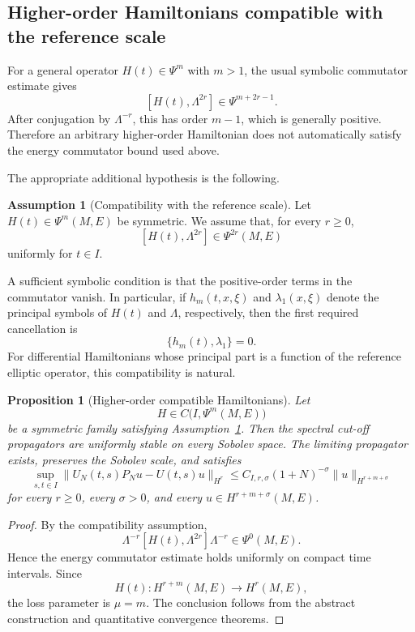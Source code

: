 \documentclass[11pt]{amsart}
\theoremstyle{plain}
\newtheorem{proposition}[theorem]{Proposition}
\theoremstyle{definition}
\newtheorem{assumption}[theorem]{Assumption}
\theoremstyle{remark}
\begin{document}
\subsection{Higher-order Hamiltonians compatible with the reference scale}
\label{subsec:higher-order-compatible-hamiltonians}

For a general operator \(H(t)\in\Psi^{m}\) with \(m>1\), the usual symbolic
commutator estimate gives
\[
[H(t),\Lambda^{2r}]
\in
\Psi^{m+2r-1}.
\]
After conjugation by \(\Lambda^{-r}\), this has order \(m-1\), which is
generally positive. Therefore an arbitrary higher-order Hamiltonian does not
automatically satisfy the energy commutator bound used above.

The appropriate additional hypothesis is the following.

\begin{assumption}[Compatibility with the reference scale]
\label{ass:principal-symbol-compatibility}
Let \(H(t)\in\Psi^{m}(M,E)\) be symmetric. We assume that, for every
\(r\geq 0\),
\[
[H(t),\Lambda^{2r}]
\in
\Psi^{2r}(M,E)
\]
uniformly for \(t\in I\).
\end{assumption}

A sufficient symbolic condition is that the positive-order terms in the
commutator vanish. In particular, if \(h_{m}(t,x,\xi)\) and
\(\lambda_{1}(x,\xi)\) denote the principal symbols of \(H(t)\) and
\(\Lambda\), respectively, then the first required cancellation is
\[
\{h_{m}(t),\lambda_{1}\}=0.
\]
For differential Hamiltonians whose principal part is a function of the
reference elliptic operator, this compatibility is natural.

\begin{proposition}[Higher-order compatible Hamiltonians]
\label{prop:higher-order-compatible-hamiltonians}
Let
\[
H\in C\bigl(I,\Psi^{m}(M,E)\bigr)
\]
be a symmetric family satisfying
Assumption~\ref{ass:principal-symbol-compatibility}. Then the spectral cut-off
propagators are uniformly stable on every Sobolev space. The limiting
propagator exists, preserves the Sobolev scale, and satisfies
\[
\sup_{s,t\in I}
\|U_{N}(t,s)P_{N}u-U(t,s)u\|_{H^{r}}
\leq
C_{I,r,\sigma}(1+N)^{-\sigma}
\|u\|_{H^{r+m+\sigma}}
\]
for every \(r\geq 0\), every \(\sigma>0\), and every
\(u\in H^{r+m+\sigma}(M,E)\).
\end{proposition}

\begin{proof}
By the compatibility assumption,
\[
\Lambda^{-r}[H(t),\Lambda^{2r}]\Lambda^{-r}
\in
\Psi^{0}(M,E).
\]
Hence the energy commutator estimate holds uniformly on compact time
intervals. Since
\[
H(t):H^{r+m}(M,E)\longrightarrow H^{r}(M,E),
\]
the loss parameter is \(\mu=m\). The conclusion follows from the abstract
construction and quantitative convergence theorems.
\end{proof}
\end{document}

